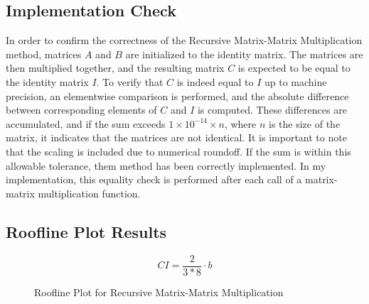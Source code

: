 \documentclass{article}
\begin{document}
\subsection{Implementation Check}
In order to confirm the correctness of the Recursive Matrix-Matrix Multiplication method, matrices \( A \) and \( B \) are initialized to the identity matrix. The matrices are then multiplied together, and the resulting matrix \( C \) is expected to be equal to the identity matrix \( I \). To verify that \( C \) is indeed equal to \( I \) up to machine precision, an elementwise comparison is performed, and the absolute difference between corresponding elements of \( C \) and \( I \) is computed. These differences are accumulated, and if the sum exceeds \( 1 \times 10^{-14} \times n \), where \( n \) is the size of the matrix, it indicates that the matrices are not identical. It is important to note that the scaling is included due to numerical roundoff. If the sum is within this allowable tolerance, them method has been correctly implemented. In my implementation, this equality check is performed after each call of a matrix-matrix multiplication function.

\subsection{Roofline Plot Results}

\begin{equation}
CI = \frac{2}{3 * 8} \cdot b 
\end{equation}

\begin{figure}[!htb]
    \centering
    \caption{Roofline Plot for Recursive Matrix-Matrix Multiplication}
\end{figure}
\end{document}
